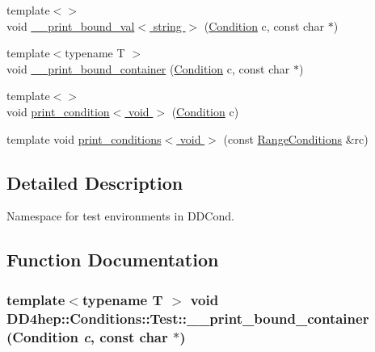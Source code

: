 \begin{DoxyCompactItemize}
\item 
{\footnotesize template$<$$>$ }\\void \hyperlink{namespace_d_d4hep_1_1_conditions_1_1_test_aaf53c694ea981e815836c9d98ded23f4}{\_\-\_\-print\_\-bound\_\-val$<$ string $>$} (\hyperlink{class_d_d4hep_1_1_conditions_1_1_condition}{Condition} c, const char $\ast$)
\item 
{\footnotesize template$<$typename T $>$ }\\void \hyperlink{namespace_d_d4hep_1_1_conditions_1_1_test_aa9341ec9790f1a8b636e612548ecdcaf}{\_\-\_\-print\_\-bound\_\-container} (\hyperlink{class_d_d4hep_1_1_conditions_1_1_condition}{Condition} c, const char $\ast$)
\item 
{\footnotesize template$<$$>$ }\\void \hyperlink{namespace_d_d4hep_1_1_conditions_1_1_test_a98d5ba8b5cefdbb09afa9ee6bbe513f4}{print\_\-condition$<$ void $>$} (\hyperlink{class_d_d4hep_1_1_conditions_1_1_condition}{Condition} c)
\item 
template void \hyperlink{namespace_d_d4hep_1_1_conditions_1_1_test_acdce8ace7d03579186b713f0c76b0a15}{print\_\-conditions$<$ void $>$} (const \hyperlink{namespace_d_d4hep_1_1_conditions_ae765f0140a33973a430280f02b6062f4}{RangeConditions} \&rc)
\end{DoxyCompactItemize}


\subsection{Detailed Description}
Namespace for test environments in DDCond. 

\subsection{Function Documentation}
\hypertarget{namespace_d_d4hep_1_1_conditions_1_1_test_aa9341ec9790f1a8b636e612548ecdcaf}{
\subsubsection[{\_\-\_\-print\_\-bound\_\-container}]{\setlength{\rightskip}{0pt plus 5cm}template$<$typename T $>$ void DD4hep::Conditions::Test::\_\-\_\-print\_\-bound\_\-container ({\bf Condition} {\em c}, \/  const char $\ast$)}}
\label{namespace_d_d4hep_1_1_conditions_1_1_test_aa9341ec9790f1a8b636e612548ecdcaf}


